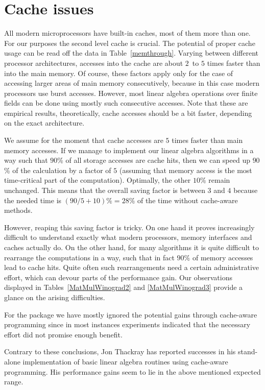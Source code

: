 \section{Cache issues}
\label{sec:cache}
%
\enlargethispage{1\baselineskip}

All modern microprocessors have built-in caches, most of them more than
one. For our purposes the second level cache is crucial. The potential
of proper cache usage can be read off the data in
Table~\ref{memthrough}. Varying between different processor
architectures, accesses into the cache are about $2$~to $5$ times faster
than into the main memory. Of course, these factors apply only for the
case of accessing larger areas of main memory consecutively, because
in this case modern processors use burst accesses. However, most
linear algebra operations over finite fields can be done using mostly 
such consecutive accesses. Note that these are empirical results,
theoretically, cache accesses should be a bit faster, depending on the
exact architecture.

We assume for the moment that cache accesses are $5$ times faster
than main memory accesses. If we manage to implement our linear
algebra algorithms in a way such that $90$\% of all storage accesses
are cache hits, then we can speed up $90$\% of the calculation by a
factor of $5$ (assuming that memory access is the most time-critical
part of the computation). Optimally, the other $10$\% remain unchanged.
This means that the overall saving factor is between $3$ and $4$ because the
needed time is $(90/5+10)\% = 28\%$ of the time without cache-aware
methods. 

However, reaping this saving factor is tricky. On one hand it proves
increasingly difficult to understand exactly what modern processors,
memory interfaces and caches actually do. On the other hand, for many
algorithms it is quite difficult to rearrange the computations in a
way, such that in fact $90\%$ of memory accesses lead to cache hits.
Quite often such rearrangements need a certain administrative effort,
which can devour parts of the performance gain.
Our observations displayed in Tables~\ref{MatMulWinograd2} and
\ref{MatMulWinograd3} provide a glance on the arising difficulties.

For the {\cvec} package we have mostly ignored the potential gains
through cache-aware programming since in most instances experiments
indicated that the necessary effort did not promise enough benefit.

Contrary to these conclusions, Jon Thackray has reported successes in his
stand-alone implementation of basic linear algebra routines using
cache-aware programming. His performance gains seem to lie in the
above mentioned expected range.
 
